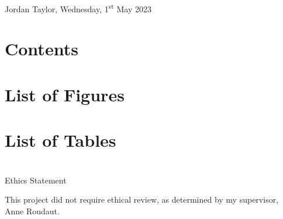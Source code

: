 \documentclass[a4paper]{article}
\begin{document}
\bigskip


\bigskip


\bigskip

Jordan Taylor, Wednesday, 1\textsuperscript{st} May 2023


\bigskip

\clearpage\section{Contents}

\bigskip


\bigskip

\setcounter{tocdepth}{3}
\renewcommand\contentsname{}
\tableofcontents

\bigskip


\bigskip


\bigskip


\bigskip


\bigskip

\clearpage\section{List of Figures}
\hypertarget{Toc98342027}{}
\bigskip

\listoffigures

\bigskip


\bigskip


\bigskip

\clearpage\section{}
\section{List of Tables}
\hypertarget{Toc98342028}{}
\bigskip


\bigskip

\listoffigures

\bigskip


\bigskip


\bigskip

\clearpage\section{}
Ethics Statement


\bigskip


\bigskip

This project did not require ethical review, as determined by my supervisor, Anne Roudaut.\textcolor{black}{ }
\end{document}
